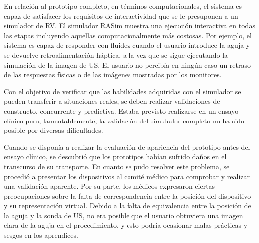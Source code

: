 



En relación al prototipo completo, en términos computacionales, el sistema es capaz de satisfacer los requisitos de interactividad que se le presuponen a un simulador de \ac{RV}. El simulador \ac{RASim} muestra una ejecución interactiva en todas las etapas incluyendo aquellas computacionalmente más costosas. Por ejemplo, el sistema es capaz de responder con fluidez cuando el usuario introduce la aguja y se devuelve retroalimentación háptica, a la vez que se sigue ejecutando la simulación de la imagen de \ac{US}. El usuario no percibía en ningún caso un retraso de las respuestas físicas o de las imágenes mostradas por los monitores.

Con el objetivo de verificar que las habilidades adquiridas con el simulador se pueden transferir a situaciones reales, se deben realizar validaciones de constructo, concurrente y predictiva. Estaba previsto realizarse en un ensayo clínico pero, lamentablemente, la validación del simulador completo no ha sido posible por diversas dificultades.

Cuando se disponía a realizar la evaluación de apariencia del prototipo antes del ensayo clínico, se descubrió que los prototipos habían sufrido daños en el transcurso de su transporte. %
En cuanto se pudo resolver este problema, se procedió a presentar los dispositivos al comité médico para comprobar y realizar una validación aparente. Por su parte, los médicos expresaron ciertas preocupaciones sobre la falta de correspondencia entre la posición del dispositivo y su representación virtual. Debido a la falta de equivalencia entre la posición de la aguja y la sonda de \ac{US}, no era posible que el usuario obtuviera una imagen clara de la aguja en el procedimiento, y esto podría ocasionar malas prácticas y sesgos en los aprendices. 


